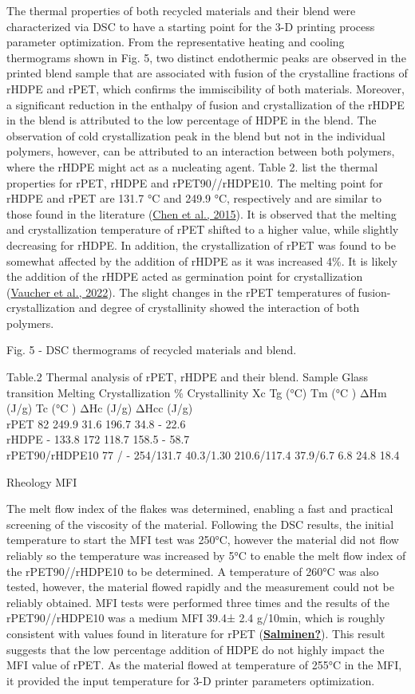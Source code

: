 \documentclass[
  12pt,
  number,
  review]{elsarticle}
\begin{document}
The thermal properties of both recycled materials and their blend were
characterized via DSC to have a starting point for the 3-D printing
process parameter optimization. From the representative heating and
cooling thermograms shown in Fig. 5, two distinct endothermic peaks are
observed in the printed blend sample that are associated with fusion of
the crystalline fractions of rHDPE and rPET, which confirms the
immiscibility of both materials. Moreover, a significant reduction in
the enthalpy of fusion and crystallization of the rHDPE in the blend is
attributed to the low percentage of HDPE in the blend. The observation
of cold crystallization peak in the blend but not in the individual
polymers, however, can be attributed to an interaction between both
polymers, where the rHDPE might act as a nucleating agent. Table 2. list
the thermal properties for rPET, rHDPE and rPET90//rHDPE10. The melting
point for rHDPE and rPET are 131.7 °C and 249.9 °C, respectively and are
similar to those found in the literature
(\protect\hyperlink{ref-chen2015}{Chen et al., 2015}). It is observed
that the melting and crystallization temperature of rPET shifted to a
higher value, while slightly decreasing for rHDPE. In addition, the
crystallization of rPET was found to be somewhat affected by the
addition of rHDPE as it was increased 4\%. It is likely the addition of
the rHDPE acted as germination point for crystallization
(\protect\hyperlink{ref-vaucher2022}{Vaucher et al., 2022}). The slight
changes in the rPET temperatures of fusion-crystallization and degree of
crystallinity showed the interaction of both polymers.

Fig. 5 - DSC thermograms of recycled materials and blend.

Table.2 Thermal analysis of rPET, rHDPE and their blend. Sample Glass
transition Melting Crystallization \% Crystallinity Xc Tg (°C) Tm (°C )
ΔHm (J/g) Tc (°C ) ΔHc (J/g) ΔHcc (J/g)\\
rPET 82 249.9 31.6 196.7 34.8 - 22.6\\
rHDPE - 133.8 172 118.7 158.5 - 58.7\\
rPET90/rHDPE10 77 / - 254/131.7 40.3/1.30 210.6/117.4 37.9/6.7 6.8 24.8
18.4

Rheology MFI

The melt flow index of the flakes was determined, enabling a fast and
practical screening of the viscosity of the material. Following the DSC
results, the initial temperature to start the MFI test was 250°C,
however the material did not flow reliably so the temperature was
increased by 5°C to enable the melt flow index of the rPET90//rHDPE10 to
be determined. A temperature of 260°C was also tested, however, the
material flowed rapidly and the measurement could not be reliably
obtained. MFI tests were performed three times and the results of the
rPET90//rHDPE10 was a medium MFI 39.4± 2.4 g/10min, which is roughly
consistent with values found in literature for rPET
(\protect\hyperlink{ref-Salminen}{\textbf{Salminen?}}). This result
suggests that the low percentage addition of HDPE do not highly impact
the MFI value of rPET. As the material flowed at temperature of 255°C in
the MFI, it provided the input temperature for 3-D printer parameters
optimization.
\end{document}
